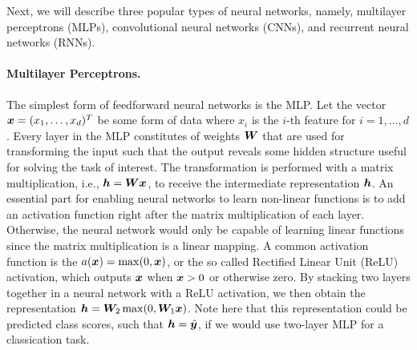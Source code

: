 Next, we will describe three popular types of neural networks, namely, multilayer perceptrons (MLPs), convolutional neural networks (CNNs), and recurrent neural networks (RNNs). 

\paragraph{Multilayer Perceptrons.} The simplest form of feedforward neural networks is the MLP. Let the vector ${\bm{x}} = (x_1, \dots, x_d)^{T}$ be some form of data where $x_i$ is the $i$-th feature for $i = 1, \dots, d$. Every layer in the MLP constitutes of weights ${\bm{W}}$ that are used for transforming the input such that the output reveals some hidden structure useful for solving the task of interest. The transformation is performed with a matrix multiplication, i.e., ${\bm{h}} = {\bm{W}} {\bm{x}}$, to receive the intermediate representation ${\bm{h}}$. An essential part for enabling neural networks to learn non-linear functions is to add an activation function right after the matrix multiplication of each layer. Otherwise, the neural network would only be capable of learning linear functions since the matrix multiplication is a linear mapping. A common activation function is the $a({\bm{x}}) = \max(0, {\bm{x}})$, or the so called Rectified Linear Unit (ReLU) activation, which outputs ${\bm{x}}$ when ${\bm{x}} > 0$ or otherwise zero. By stacking two layers together in a neural network with a ReLU activation, we then obtain the representation ${\bm{h}} = {\bm{W}}_2\max(0,  {\bm{W}}_1{\bm{x}})$. Note here that this representation could be predicted class scores, such that ${\bm{h}} = \hat{{\bm{y}}}$, if we would use two-layer MLP for a classication task. 

